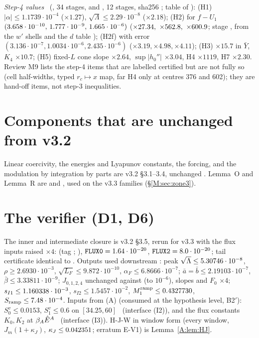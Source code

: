 \documentclass[11pt]{article}
\begin{document}
\noindent\emph{Step-4 values} \tC\ (, 34 stages, and , 12 stages, sha256 ; table of ): (H1) $|\alpha|\le1.1739\cdot10^{-4}$ ($\times1.27$), $\sqrt\Lambda\le2.29\cdot10^{-8}$ ($\times2.18$); (H2) for $f-U_1$ $(3.658\cdot10^{-10},\,1.777\cdot10^{-9},\,1.665\cdot10^{-6})$ ($\times27.34,\ \times562.8,\ \times600.9$; stage , from the $w'$ shells and the $d$ table ); (H2f) with error $(3.136\cdot10^{-7},1.0034\cdot10^{-6},2.435\cdot10^{-6})$ ($\times3.19,\times4.98,\times4.11$); (H3) $\times15.7$ in $\bar Y$, $K_4$ $\times10.7$; (H5) fixed-$L$ cone slope $\times2.64$, $\sup|h_0''|$ $\times3.04$, H4 $\times1119$, H7 $\times2.30$. Review M9 lists the step-4 items that are labelled certified but are not fully so (cell half-widths, typed $r_c\mapsto x$ map, far H4 only at centres 376 and 602); they are hand-off items, not step-3 inequalities.

\section{Components that are unchanged from v3.2}\label{M:sec:unchanged}
Linear coercivity, the energies and Lyapunov constants, the forcing, and the modulation by integration by parts are v3.2 \S3.1--3.4, unchanged \tC. Lemma~O and Lemma~R are  and , used on the v3.3 families (\S\ref{M:sec:zone3}).

\section{The verifier (D1, D6)}\label{M:sec:verifier}
The inner and intermediate closure is v3.2 \S3.5, rerun for v3.3 with the flux inputs raised $\times4$:  (tag ; ), $\fn{FLUX0}=1.64\cdot10^{-20}$, $\fn{FLUX2}=8.0\cdot10^{-20}$; tail certificate identical to . Outputs used downstream \tC: peak $\sqrt\Lambda\le5.30746\cdot10^{-8}$, $\rho\ge2.6930\cdot10^{-3}$, $\sqrt{L_F}\le9.872\cdot10^{-10}$, $\alpha_F\le6.8666\cdot10^{-7}$; $\bar a=\bar b\le2.19103\cdot10^{-7}$, $\bar\beta\le3.33811\cdot10^{-9}$; $J_{0,1,2,4}$ unchanged against  (to $10^{-6}$), slopes and $F_0$ $\times4$; $s_{I1}\le1.160338\cdot10^{-3}$, $s_{I2}\le1.5457\cdot10^{-2}$, $M_1^{\rm ramp}\le0.4327730$, $S_{\rm ramp}\le7.48\cdot10^{-4}$. Inputs from (A) (consumed at the hypothesis level, B2$'$): $S^v_0\le0.0153$, $S^v_1\le0.6$ on $[34.25,60]$ \tB\ (interface (I2)), and the flux constants $K_0,K_2$ at $\beta_A\hat E^A$ \tB\ (interface (I3)). H-J-W in window form (every window, $J_m(1+\kappa_J)$, $\kappa_J\le0.042351$; erratum E-V1) is Lemma~\ref{A:lem:HJ}.
\end{document}

